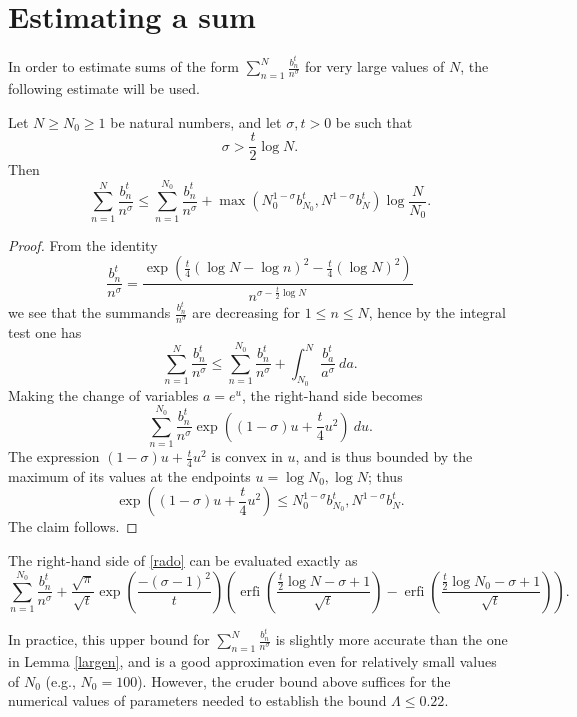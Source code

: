 \section{Estimating a sum}

In order to estimate sums of the form $\sum_{n=1}^N \frac{b_n^t}{n^\sigma}$ for very large values of $N$, the following estimate will be used.

\begin{lemma}\label{largen}
Let $N \geq N_0 \geq 1$ be natural numbers, and let $\sigma,t > 0$ be such that
$$ \sigma > \frac{t}{2} \log N.$$
Then
$$ \sum_{n=1}^N \frac{b_n^t}{n^\sigma} \leq \sum_{n=1}^{N_0}
\frac{b_n^t}{n^\sigma}  + 
\max( N_0^{1-\sigma} b_{N_0}^t, N^{1-\sigma} b_N^t ) \log \frac{N}{N_0}.$$
\end{lemma}

\begin{proof}  From the identity
$$ \frac{b_n^t}{n^\sigma} = \frac{\exp\left( \frac{t}{4} (\log N - \log n)^2 - \frac{t}{4} (\log N)^2\right) }{n^{\sigma - \frac{t}{2} \log N}}$$
we see that the summands $\frac{b_n^t}{n^\sigma}$ are decreasing for $1 \leq n \leq N$, hence by the integral test one has
\begin{equation}\label{rado}
 \sum_{n=1}^N \frac{b_n^t}{n^\sigma} \leq \sum_{n=1}^{N_0}
\frac{b_n^t}{n^\sigma}  + \int_{N_0}^N \frac{b_a^t}{a^\sigma}\ da.
\end{equation}
Making the change of variables $a = e^u$, the right-hand side becomes
$$\sum_{n=1}^{N_0} \frac{b_n^t}{n^\sigma} \exp( (1-\sigma) u + \frac{t}{4} u^2 )\ du.$$
The expression $(1-\sigma) u + \frac{t}{4} u^2$ is convex in $u$, and is thus bounded by the maximum of its values at the endpoints $u = \log N_0, \log N$; thus
$$\exp( (1-\sigma) u + \frac{t}{4} u^2) \leq N_0^{1-\sigma} b_{N_0}^t, N^{1-\sigma} b_N^t.$$
The claim follows. 
\end{proof}

\begin{remark}  The right-hand side of \eqref{rado} can be evaluated exactly as
$$
\sum_{n=1}^{N_0}
\frac{b_n^t}{n^\sigma}  + \frac{\sqrt \pi}{\sqrt t} \exp(\frac{-(\sigma - 1)^2}{t}) \left( \operatorname{erfi}\left(\frac{\frac{t}{2} \log N  - \sigma + 1}{\sqrt t} \right) - \operatorname{erfi}\left(\frac{\frac{t}{2} \log N_0  - \sigma + 1}{\sqrt t}\right) \right).$$

In practice, this upper bound for $\sum_{n=1}^N \frac{b_n^t}{n^\sigma}$ is slightly more accurate than the one in Lemma \ref{largen}, and is a good approximation even for relatively small values of $N_0$ (e.g., $N_0=100$).  However, the cruder bound above suffices for the numerical values of parameters needed to establish the bound $\Lambda \leq 0.22$.
\end{remark}

